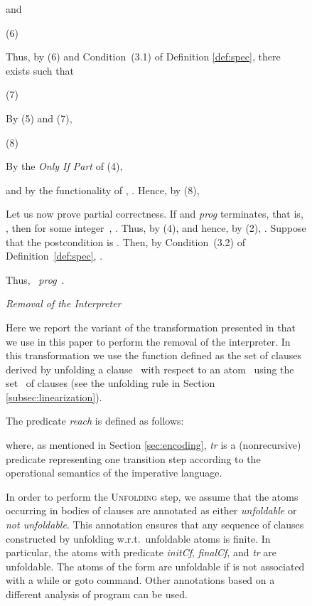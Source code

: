 \documentclass[english]{tlp}
\begin{document}
\begin{figure}[ht]
\begin{flushleft}
\begin{minipage}{124mm}
\noindent
and 

  \hfill (6)

\smallskip
\noindent
Thus, by (6) and {Condition~(3.1)}
of Definition \ref{def:spec}, there exists  such that 

\smallskip
 \hfill (7)

\smallskip
\noindent
By (5) and (7),

\smallskip
 \hfill (8)

\smallskip
\noindent
By the {\it Only If Part} of (4), 

\smallskip
 

\smallskip
\noindent
and
by the functionality of , . Hence, by (8),

\smallskip


\medskip
\noindent
Let us now prove partial correctness.
If   and 
\textit{prog} terminates, that is, ,  
then for some integer~, .
Thus, by (4),  
and hence, by (2), .
Suppose that  the postcondition  is . Then,
by {Condition~(3.2)} of Definition~\ref{def:spec}, .

Thus, \mbox{ {\textit{prog}} }.
\hfill 



\bigskip

\noindent
{\it Removal of the Interpreter}


\noindent
Here we report the variant of the transformation presented in \cite{De&14c} that
we use in this paper to perform the removal of the interpreter. 
In this transformation we use the function  
defined as the set of clauses derived by unfolding a clause~ with respect to an atom~
using the set~ of clauses (see the unfolding rule in Section \ref{subsec:linearization}).

The predicate {\it reach} is defined as follows:





\noindent
where, as mentioned in Section \ref{sec:encoding}, {\it tr} is a (nonrecursive) predicate representing 
one transition step according to the operational semantics of the imperative language.

In order to perform the \textsc{Unfolding} step,
we assume that the atoms occurring in bodies of clauses 
are annotated as either {\em unfoldable} 
or {\em not unfoldable}. 
This annotation 
ensures that any sequence of clauses constructed by unfolding
w.r.t.~unfoldable atoms is finite. 
In particular, the atoms with predicate \textit{initCf\/}, \textit{finalCf\/},
and {\it tr\/} are unfoldable. The atoms of the form 
 are unfoldable if 
is not associated with a while or goto command. 
Other annotations based on a different analysis of program  can be used.





\end{minipage}
\end{flushleft}
\end{figure}
\end{document}
